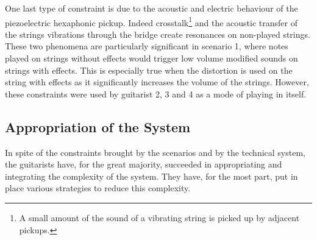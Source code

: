 \documentclass{article}
\begin{document}
One last type of constraint is due to the acoustic and electric behaviour of the piezoelectric hexaphonic pickup. Indeed crosstalk\footnote{A small amount of the sound of a vibrating string is picked up by adjacent pickups.} and  the acoustic transfer of the strings vibrations through the bridge create resonances on non-played strings. These two phenomena are particularly significant in scenario 1, where notes played on strings without effects would trigger low volume modified sounds on strings with effects. This is especially true when the distortion is used on the string with effects as it significantly increases the volume of the strings.
However, these constraints were used by guitarist 2, 3 and 4 as a mode of playing in itself. 




\subsection{Appropriation of the System}

In spite of the constraints brought by the scenarios and by the technical system, the guitarists have, for the great majority, succeeded in appropriating and integrating the complexity of the system. They have, for the most part, put in place various strategies to reduce this complexity.
\end{document}
